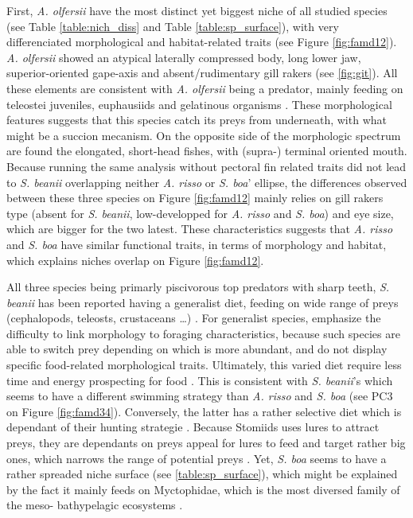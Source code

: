 

First, \textit{A. olfersii} have the most distinct yet biggest niche of all studied species (see Table \ref{table:nich_diss} and Table \ref{table:sp_surface}), with very differenciated morphological and habitat-related traits (see Figure \ref{fig:famd12}). \textit{A. olfersii} showed an atypical laterally compressed body, long lower jaw, superior-oriented gape-axis and absent/rudimentary gill rakers (see \ref{fig:git}). All these elements are consistent with \textit{A. olfersii} being a predator, mainly feeding on teleostei juveniles, euphausiids and gelatinous organisms \citep{eduardo2020}. These morphological features suggests that this species catch its preys from underneath, with what might be a succion mecanism. On the opposite side of the morphologic spectrum are found the elongated, short-head fishes, with (supra-) terminal oriented mouth. Because running the same analysis without pectoral fin related traits did not lead to \textit{S. beanii} overlapping neither \textit{A. risso} or \textit{S. boa}' ellipse, the differences observed between these three species on Figure \ref{fig:famd12} mainly relies on gill rakers type (absent for \textit{S. beanii}, low-developped for \textit{A. risso} and \textit{S. boa}) and eye size, which are bigger for the two latest. These characteristics suggests that \textit{A. risso} and \textit{S. boa} have similar functional traits, in terms of morphology and habitat, which explains niches overlap on Figure \ref{fig:famd12}. 

All three species being primarly piscivorous top predators with sharp teeth, \textit{S. beanii} has been reported having a generalist diet, feeding on wide range of preys (cephalopods, teleosts, crustaceans \ldots{}) \citep{geidner2008}. For generalist species, \citet{sibbing2000} emphasize the difficulty to link morphology to foraging characteristics, because such species are able to switch prey depending on which is more abundant, and do not display specific food-related morphological traits. Ultimately, this varied diet require less time and energy prospecting for food \citep{geidner2008}. This is consistent with \textit{S. beanii}'s which seems to have a different swimming strategy than \textit{A. risso} and \textit{S. boa} (see PC3 on Figure \ref{fig:famd34}). Conversely, the latter has a rather selective diet which is dependant of their hunting strategie \citep{sutton1996}. Because Stomiids uses lures to attract preys, they are dependants on preys appeal for lures to feed and target rather big ones, which narrows the range of potential preys \citep{geidner2008,germain2019}. Yet, \textit{S. boa} seems to have a rather spreaded niche surface (see \ref{table:sp_surface}), which might be explained by the fact it mainly feeds on Myctophidae, which is the most diversed family of the meso- bathypelagic ecosystems \citep{garcia2021,sutton1996}. 

